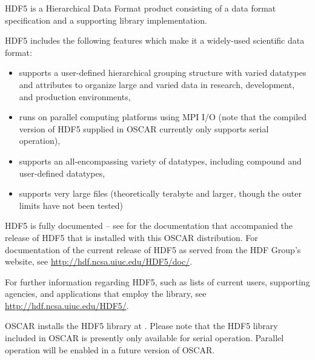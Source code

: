 %
%
%

HDF5 is a Hierarchical Data Format product consisting of a data format
specification and a supporting library implementation.

HDF5 includes the following features which make it a widely-used
scientific data format:

\begin{itemize}
\item supports a user-defined hierarchical grouping structure with
  varied datatypes and attributes to organize large and varied data in
  research, development, and production environments,


\item runs on parallel computing platforms using MPI I/O (note that
  the compiled version of HDF5 supplied in OSCAR currently only
  supports serial operation),

\item supports an all-encompassing variety of datatypes, including
  compound and user-defined datatypes,

\item supports very large files (theoretically terabyte and larger,
  though the outer limits have not been tested)
\end{itemize}

HDF5 is fully documented -- see
 for the
documentation that accompanied the release of HDF5 that is installed
with this OSCAR distribution.  For documentation of the current
release of HDF5 as served from the HDF Group's website, see
\url{http://hdf.ncsa.uiuc.edu/HDF5/doc/}.

For further information regarding HDF5, such as lists of current
users, supporting agencies, and applications that employ the library,
see \url{http://hdf.ncsa.uiuc.edu/HDF5/}.


OSCAR installs the HDF5 library at
.  Please note that the HDF5
library included in OSCAR is presently only available for serial
operation.  Parallel operation will be enabled in a future version of
OSCAR.

